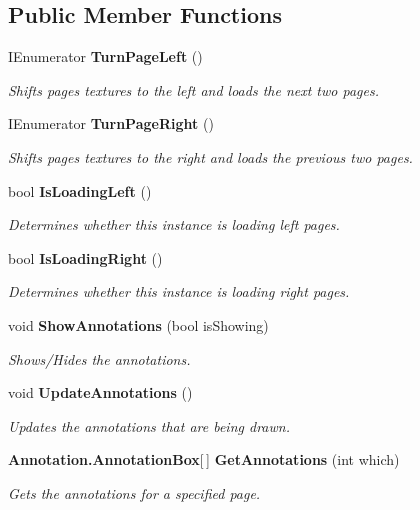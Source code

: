 \subsection*{Public Member Functions}
\begin{DoxyCompactItemize}
\item 
I\+Enumerator {\bf Turn\+Page\+Left} ()
\begin{DoxyCompactList}\small\item\em Shifts page\textquotesingle{}s textures to the left and loads the next two pages. \end{DoxyCompactList}\item 
I\+Enumerator {\bf Turn\+Page\+Right} ()
\begin{DoxyCompactList}\small\item\em Shifts page\textquotesingle{}s textures to the right and loads the previous two pages. \end{DoxyCompactList}\item 
bool {\bf Is\+Loading\+Left} ()
\begin{DoxyCompactList}\small\item\em Determines whether this instance is loading left pages. \end{DoxyCompactList}\item 
bool {\bf Is\+Loading\+Right} ()
\begin{DoxyCompactList}\small\item\em Determines whether this instance is loading right pages. \end{DoxyCompactList}\item 
void {\bf Show\+Annotations} (bool is\+Showing)
\begin{DoxyCompactList}\small\item\em Shows/\+Hides the annotations. \end{DoxyCompactList}\item 
void {\bf Update\+Annotations} ()
\begin{DoxyCompactList}\small\item\em Updates the annotations that are being drawn. \end{DoxyCompactList}\item 
{\bf Annotation.\+Annotation\+Box}[$\,$] {\bf Get\+Annotations} (int which)
\begin{DoxyCompactList}\small\item\em Gets the annotations for a specified page. \end{DoxyCompactList}\end{DoxyCompactItemize}
